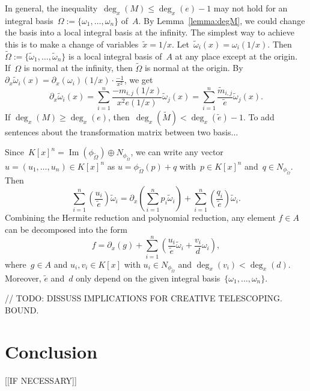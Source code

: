 \documentclass{sig-alternate}
\newcommand{\red}{\color{red}}
\def\im{\operatorname{Im}}
\begin{document}
In general, the inequality~$\deg_x(M)\leq \deg_x(e)-1$ may not hold
for an integral basis~$\Omega := \{\omega_1, \ldots, \omega_n\}$ of~$A$. By Lemma~\ref{lemma:degM}, we could
change the basis into a local integral basis at the infinity. The simplest
way to achieve this is to make a change of variables~$\tilde x = 1/x$.
Let~$\tilde \omega_i(x) = \omega_i(1/x)$. Then $\tilde \Omega := \{\tilde \omega_1, \ldots, \tilde \omega_n\}$
is a local integral basis of~$A$ at any place except at the origin. If~$\Omega$
is normal at the infinity, then $\tilde \Omega$ is normal at the origin.
By $\partial_x \tilde \omega_i(x) = \partial_x(\omega_i)(1/x)\cdot \frac{-1}{x^2} $, we get
\[\partial_x \tilde \omega_i(x) = \sum_{i=1}^n\frac{-m_{i, j}(1/x)}{x^2e(1/x)}  \tilde \omega_j(x) = \sum_{i=1}^n \frac{\tilde m_{i, j}}{\tilde e}  \tilde \omega_j(x) .\]
If $\deg_x(M) \geq \deg_x(e)$, then~$\deg_x(\tilde M)<\deg_x(\tilde e)-1$.
{\red To add sentences about the transformation matrix between two basis... }

Since~$K[x]^n = \im(\phi_{\tilde \Omega}) \oplus N_{\phi_{\tilde \Omega}}$,
we can write any vector~$u = (u_1, \ldots, u_n)\in K[x]^n$
as $u = \phi_{\tilde \Omega}(p) + q$ with~$p\in K[x]^n$ and~$q\in N_{\phi_{\tilde \Omega}}$. Then
\[\sum_{i=1}^n \left(\frac{u_i}{\tilde e}\right){\tilde \omega}_i = \partial_x\left(\sum_{i=1}^n p_i {\tilde \omega}_i\right)
+ \sum_{i=1}^n \left(\frac{q_i}{\tilde e}\right){\tilde \omega}_i.\]
Combining the Hermite reduction and polynomial reduction, any element $f\in A$ can be
decomposed into the form
\[f = \partial_x(g) +  \sum_{i=1}^n \left(\frac{u_i}{\tilde e}\tilde \omega_i + \frac{v_i}{d}\omega_i\right),\]
where~$g\in A$ and $u_i, v_i\in K[x]$ with $u_i \in N_{\phi_{\tilde \Omega}}$ and $\deg_x(v_i) < \deg_x(d)$.
Moreover, $\tilde e$ and~$d$ only depend on the given integral basis~$\{\omega_1, \ldots, \omega_n\}$.

// TODO: DISSUSS IMPLICATIONS FOR CREATIVE TELESCOPING. BOUND. 

\section{Conclusion}

[[IF NECESSARY]]



\end{document}
